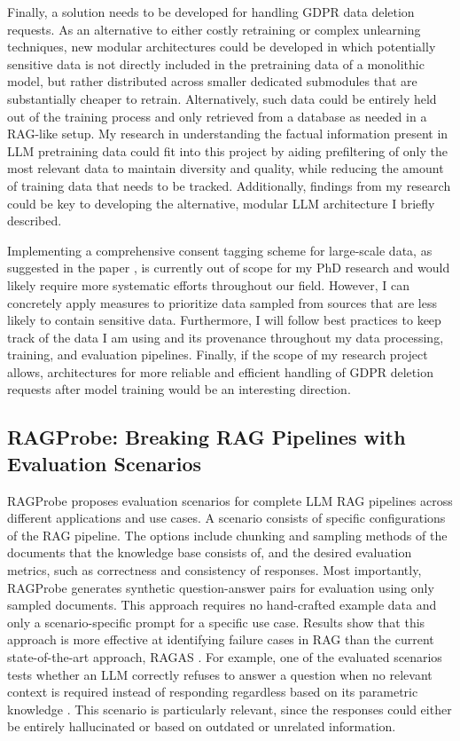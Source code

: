 \documentclass[11pt]{article}
\begin{document}
Finally, a solution needs to be developed for handling GDPR data deletion requests. As an alternative to either costly retraining or complex unlearning techniques, new modular architectures could be developed in which potentially sensitive data is not directly included in the pretraining data of a monolithic model, but rather distributed across smaller dedicated submodules that are substantially cheaper to retrain. Alternatively, such data could be entirely held out of the training process and only retrieved from a database as needed in a RAG-like setup.
My research in understanding the factual information present in LLM pretraining data could fit into this project by aiding prefiltering of only the most relevant data to maintain diversity and quality, while reducing the amount of training data that needs to be tracked. Additionally, findings from my research could be key to developing the alternative, modular LLM architecture I briefly described.

Implementing a comprehensive consent tagging scheme for large-scale data, as suggested in the paper \parencite{10556135}, is currently out of scope for my PhD research and would likely require more systematic efforts throughout our field. However, I can concretely apply measures to prioritize data sampled from sources that are less likely to contain sensitive data. Furthermore, I will follow best practices to keep track of the data I am using and its provenance throughout my data processing, training, and evaluation pipelines. Finally, if the scope of my research project allows, architectures for more reliable and efficient handling of GDPR deletion requests after model training would be an interesting direction.

\subsection{RAGProbe: Breaking RAG Pipelines with Evaluation Scenarios}

RAGProbe \parencite{11029995} proposes evaluation scenarios for complete LLM RAG pipelines across different applications and use cases. A scenario consists of specific configurations of the RAG pipeline. The options include chunking and sampling methods of the documents that the knowledge base consists of, and the desired evaluation metrics, such as correctness and consistency of responses. Most importantly, RAGProbe generates synthetic question-answer pairs for evaluation using only sampled documents. This approach requires no hand-crafted example data and only a scenario-specific prompt for a specific use case.
Results show that this approach is more effective at identifying failure cases in RAG than the current state-of-the-art approach, RAGAS \parencite{Shahul2023RAGAsAE}.
For example, one of the evaluated scenarios tests whether an LLM correctly refuses to answer a question when no relevant context is required instead of responding regardless based on its parametric knowledge \parencite{11029995}. This scenario is particularly relevant, since the responses could either be entirely hallucinated or based on outdated or unrelated information.
\end{document}

